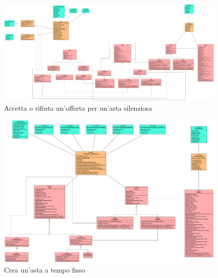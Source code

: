             \begin{figure}[htbp!]
                \centering
                    \includegraphics[width=1\linewidth]{Immagini/Diagrammi/Class Diagram/Venditore e compratore/AccettaRifiutaOffertaSilenziosa.pdf}
                \caption{Accetta o rifiuta un'offerta per un'asta silenziosa}
            \end{figure}
            
            \begin{figure}[htbp!]
                \centering
                    \includegraphics[width=1\linewidth]{Immagini/Diagrammi/Class Diagram/Venditore e compratore/CreaAstaFissa.pdf}
                \caption{Crea un'asta a tempo fisso}
            \end{figure}
            
